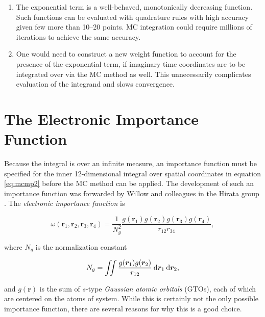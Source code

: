 \begin{enumerate}

\item The exponential term is a well-behaved, monotonically decreasing function.
	Such functions can be evaluated with quadrature rules with high accuracy
	given few more than 10--20 points. MC integration could require millions
	of iterations to achieve the same accuracy.

\item One would need to construct a new weight function to account for the
	presence of the exponential term, if imaginary time coordinates are to
	be integrated over via the MC method as well. This unnecessarily
	complicates evaluation of the integrand and slows convergence.

\end{enumerate}

\section{The Electronic Importance Function}
\label{s:elec-imp}

Because the integral is over an infinite measure, an importance function must be
specified for the inner 12-dimensional integral over spatial coordinates in
equation \ref{eq:mcmp2} before the MC method can be applied. The development of
such an importance function was forwarded by Willow and colleagues in the Hirata
group \cite{willow1, willow2}. The \emph{electronic importance function} is

\begin{equation}
\omega(\bm r_1, \bm r_2, \bm r_3, \bm r_4)
=
\frac{1}{N_g^2} \frac{g(\bm r_1) g(\bm r_2) g(\bm r_3) g(\bm r_4)}{r_{12}r_{34}}
,
\end{equation}

\noindent where $N_g$ is the normalization constant

\begin{equation}
N_g
=
\iint \frac{g(\bm r_1) g(\bm r_2)}{r_{12}} \:\mathrm{d}\bm r_1 \:\mathrm{d}\bm r_2,
\end{equation}

\noindent and $g(\bm r)$ is the sum of $s$-type \emph{Gaussian atomic orbitals}
(GTOs), each of which are centered on the atoms of system. While this is
certainly not the only possible importance function, there are several reasons
for why this is a good choice.

